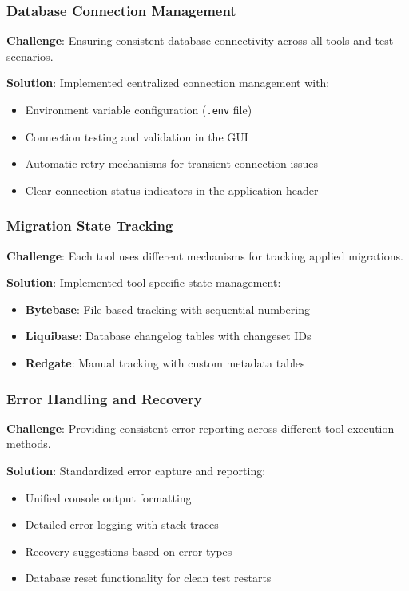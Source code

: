\documentclass[11pt,a4paper]{article}
\begin{document}
\subsubsection{Database Connection Management}
\textbf{Challenge}: Ensuring consistent database connectivity across all tools and test scenarios.

\textbf{Solution}: Implemented centralized connection management with:
\begin{itemize}
\item Environment variable configuration (\texttt{.env} file)
\item Connection testing and validation in the GUI
\item Automatic retry mechanisms for transient connection issues
\item Clear connection status indicators in the application header
\end{itemize}

\subsubsection{Migration State Tracking}
\textbf{Challenge}: Each tool uses different mechanisms for tracking applied migrations.

\textbf{Solution}: Implemented tool-specific state management:
\begin{itemize}
\item \textbf{Bytebase}: File-based tracking with sequential numbering
\item \textbf{Liquibase}: Database changelog tables with changeset IDs
\item \textbf{Redgate}: Manual tracking with custom metadata tables
\end{itemize}

\subsubsection{Error Handling and Recovery}
\textbf{Challenge}: Providing consistent error reporting across different tool execution methods.

\textbf{Solution}: Standardized error capture and reporting:
\begin{itemize}
\item Unified console output formatting
\item Detailed error logging with stack traces
\item Recovery suggestions based on error types
\item Database reset functionality for clean test restarts
\end{itemize}
\end{document}

